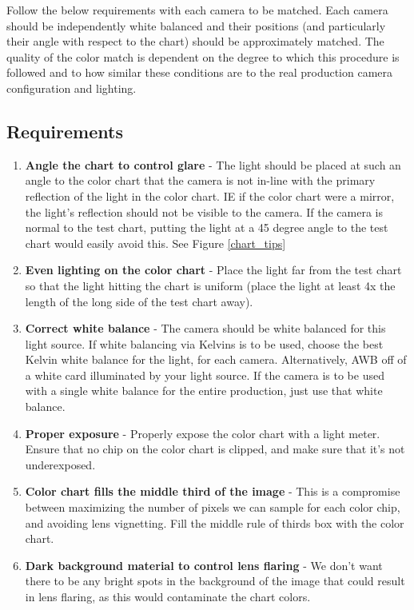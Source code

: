 \documentclass[twoside]{article}
\begin{document}
Follow the below requirements with each camera to be matched. Each camera should be independently white balanced and their positions (and particularly their angle with respect to the chart) should be approximately matched. The quality of the color match is dependent on the degree to which this procedure is followed and to how similar these conditions are to the real production camera configuration and lighting.


\subsection{Requirements}
\begin{enumerate}
    \item \textbf{Angle the chart to control glare} - The light should be placed at such an angle to the color chart that the camera is not in-line with the primary reflection of the light in the color chart. IE if the color chart were a mirror, the light's reflection should not be visible to the camera. If the camera is normal to the test chart, putting the light at a 45 degree angle to the test chart would easily avoid this. See Figure \ref{chart_tips}
    \item \textbf{Even lighting on the color chart} - Place the light far from the test chart so that the light hitting the chart is uniform (place the light at least 4x the length of the long side of the test chart away).
    \item \textbf{Correct white balance} - The camera should be white balanced for this light source. If white balancing via Kelvins is to be used, choose the best Kelvin white balance for the light, for each camera. Alternatively, AWB off of a white card illuminated by your light source. If the camera is to be used with a single white balance for the entire production, just use that white balance.
    \item \textbf{Proper exposure} - Properly expose the color chart with a light meter. Ensure that no chip on the color chart is clipped, and make sure that it's not underexposed.
    \item \textbf{Color chart fills the middle third of the image} - This is a compromise between maximizing the number of pixels we can sample for each color chip, and avoiding lens vignetting. Fill the middle rule of thirds box with the color chart.
    \item \textbf{Dark background material to control lens flaring} - We don't want there to be any bright spots in the background of the image that could result in lens flaring, as this would contaminate the chart colors.

\end{enumerate}
\end{document}

